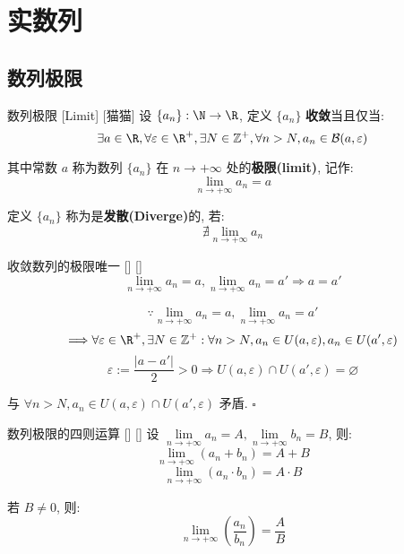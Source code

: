 \documentclass[UTF8]{ctexart}
\begin{document}
        \section{实数列}
  
            \subsection{数列极限}
			
			\begin{dfn}
			    {数列极限}
			    [Limit]
			    [猫猫]
				设 \(\{a_n\}:\N\to\R\), 定义 \(\{a_n\}\) \textbf{收敛}当且仅当: 
				\[\exists a\in \R, \forall \varepsilon\in\R^+, \exists N\in\mathbb{Z}^+, \forall n>N, a_n\in\mathcal{B}(a,\varepsilon)\]
				
				其中常数 \(a\) 称为数列 \(\{a_n\}\) 在 \(n\to+\infty\) 处的\textbf{极限(limit)}, 记作: 
				\[\lim_{n\to+\infty}a_n=a\]
				
				定义 \(\{a_n\}\) 称为是\textbf{发散(Diverge)}的, 若: 
				\[\nexists\lim_{n\to+\infty}a_n\]
			\end{dfn}
			
			\begin{ppt}
			    []
			    {收敛数列的极限唯一}
			    []
			    []
				\[\lim_{n\to+\infty}a_n=a, \lim_{n\to+\infty}a_n=a'\Longrightarrow a=a'\]
			\end{ppt}
			
			\begin{prf}
				\[\because\lim_{n\to+\infty}a_n=a, \lim_{n\to+\infty}a_n=a'\]
				\[\Longrightarrow\forall\varepsilon\in\R^+, \exists N\in\mathbb{Z}^+: \forall n>N, a_n\in U(a,\varepsilon), a_n\in U(a',\varepsilon)\]
				\[\varepsilon:=\frac{|a-a'|}{2}>0\Longrightarrow U(a,\varepsilon)\cap U(a',\varepsilon)=\varnothing\]
				
				与 \(\forall n>N, a_n\in U(a,\varepsilon)\cap U(a',\varepsilon)\) 矛盾. \(\square\)
                \end{prf}
				
			\begin{ppt}
			    []
			    {数列极限的四则运算}
			    []
			    []
				设 \(\lim\limits_{n\to+\infty}a_n=A, \lim\limits_{n\to+\infty}b_n=B\), 则: 
                \[\lim\limits_{n\to+\infty}(a_n+b_n)=A+B\]
                \[\lim\limits_{n\to+\infty}(a_n\cdot b_n)=A\cdot B\]

                若 \(B\neq 0\), 则: 
                \[\lim\limits_{n\to+\infty}(\frac{a_n}{b_n})=\frac{A}{B}\]
			\end{ppt}
			
\end{document}
